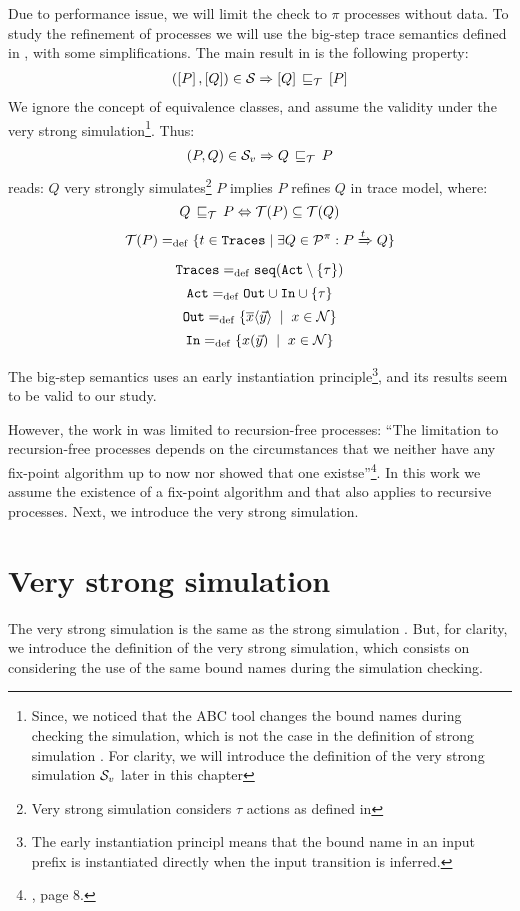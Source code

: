 Due to performance issue, we will limit the check to $\pi$ processes without data. To study the refinement of \picalc{} processes we will use the big-step trace semantics defined in \cite{gieseking}, with some simplifications. 
The main result in \cite{gieseking} is the following property:
\begin{align}
    (\ec{P},\ec{Q})\in{}\simu \Rightarrow \ec{Q} \refi \ec{P} \label{property1}
\end{align}
We ignore the concept of equivalence classes, and assume the validity under the very strong simulation\footnote{Since, we noticed that the ABC tool changes the bound names during checking the simulation, which is not the case in the definition of strong simulation . For clarity, we will introduce the definition of the very strong simulation $\mathcal{S}_v$ later in this chapter}. Thus:
\begin{align}
    (P,Q)\in{}\simuv \Rightarrow Q \refi P
\label{property2}
\end{align}
 reads: $Q$ very strongly simulates\footnote{Very strong simulation considers $\tau$ actions as defined in } $P$ implies $P$ refines $Q$ in trace model, where:
\[Q\refi P \Leftrightarrow \Traces[P]\subseteq\Traces[Q]\]
\[\Traces[P] \define \{t\in \tr \mid \exists Q\in\procs: P \bigstep{t} Q\}\]
\[\tr \define \seqset{\actions\setminus\set{\tau}}\]
\[\actions\define\outA\cup\inA\cup\set{\tau}\]
\[\outA\define\set[x\in\names]{\out{x}{\vec{y}}}\]
\[\inA\define\set[x\in\names]{\inp{x}{\vec{y}}}\]

The big-step semantics uses an early instantiation principle\footnote{The early instantiation principl means that the bound name in an input prefix is instantiated directly when the input transition is inferred.}, and its results seem to be valid to our study.



However, the work in \cite{gieseking} was limited to recursion-free processes: ``The limitation to recursion-free processes depends on the circumstances that we neither have any fix-point algorithm up to now nor showed that one existse''\footnote{\cite{gieseking}, page $8$.}. In this work we assume the existence of a fix-point algorithm and that  also applies to recursive processes.
Next, we introduce the very strong simulation.
\section{Very strong simulation}
\label{sec_failure-refinement}
The very strong simulation is the same as the strong simulation . But, for clarity, we introduce the definition of the very strong simulation, which consists on considering the use of the same bound names during the simulation checking.

